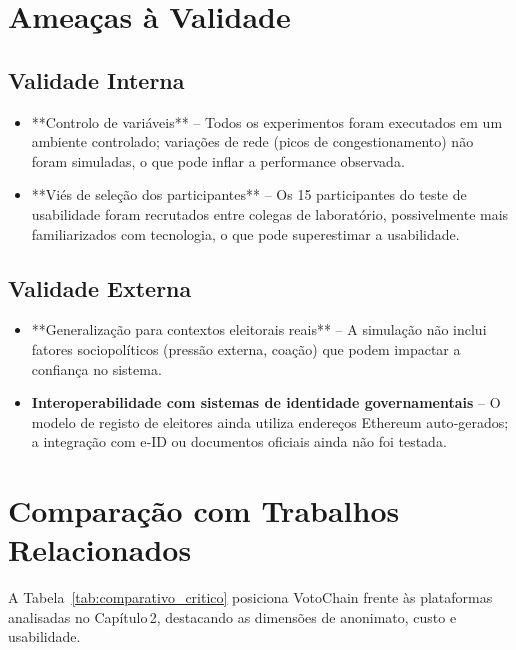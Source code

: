 \section{Ameaças à Validade}
\subsection{Validade Interna}
\begin{itemize}
    \item **Controlo de vari{\'a}veis** – Todos os experimentos foram executados em um ambiente controlado; varia{\c{c}}{\~o}es de rede (picos de congestionamento) n{\~a}o foram simuladas, o que pode inflar a performance observada.
    \item **Viés de seleção dos participantes** – Os 15 participantes do teste de usabilidade foram recrutados entre colegas de laboratório, possivelmente mais familiarizados com tecnologia, o que pode superestimar a usabilidade.
\end{itemize}

\subsection{Validade Externa}
\begin{itemize}
    \item **Generalização para contextos eleitorais reais** – A simulação não inclui fatores sociopolíticos (pressão externa, coação) que podem impactar a confiança no sistema.
    \item \textbf{Interoperabilidade com sistemas de identidade governamentais} – O modelo de registo de eleitores ainda utiliza endereços Ethereum auto‑gerados; a integração com e‑ID ou documentos oficiais ainda não foi testada.
\end{itemize}

\section{Comparação com Trabalhos Relacionados}
A Tabela~\ref{tab:comparativo_critico} posiciona VotoChain frente às plataformas analisadas no Capítulo 2, destacando as dimensões de anonimato, custo e usabilidade.
\begin{table}[h!]
\centering
\caption{Comparativo cr{\'i}tico entre VotoChain e solu{\c{c}}{\~o}es existentes}
\label{tab:comparativo_critico}
\end{table}


